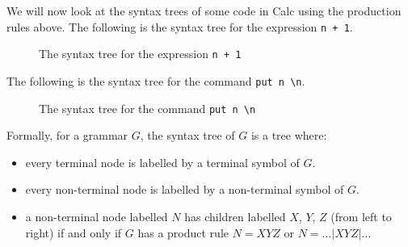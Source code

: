 \documentclass[a4paper, openany]{memoir}
\begin{document}
We will now look at the syntax trees of some code in Calc using the production rules above. The following is the syntax tree for the expression \texttt{n + 1}.
\begin{figure}[H]
    \centering
    \caption{The syntax tree for the expression \texttt{n + 1}}
\end{figure}
\noindent The following is the syntax tree for the command \texttt{put n \textbackslash n}.
\begin{figure}[H]
    \centering
    \caption{The syntax tree for the command \texttt{put n \textbackslash n}}
\end{figure}

Formally, for a grammar $G$, the syntax tree of $G$ is a tree where:
\begin{itemize}
    \item every terminal node is labelled by a terminal symbol of $G$.
    \item every non-terminal node is labelled by a non-terminal symbol of $G$.
    \item a non-terminal node labelled $N$ has children labelled $X$, $Y$, $Z$ (from left to right) if and only if $G$ has a product rule $N = XYZ$ or $N = \dots | XYZ | \dots$
\end{itemize}
\end{document}
